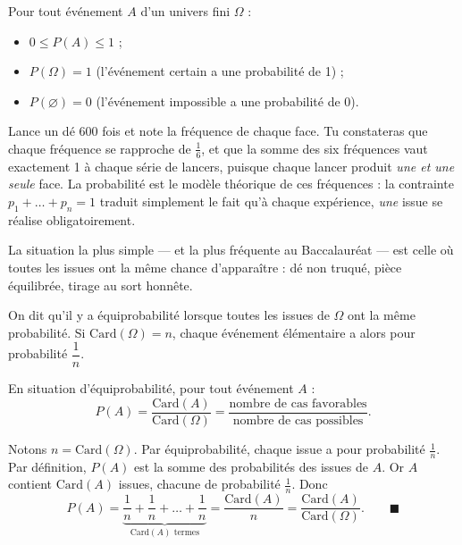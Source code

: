 \documentclass[11pt]{article}
\newcommand{\cle}[1]{{\popxbold\color{popdark}#1}}
\newcounter{popsec}
\newcounter{popsub}
\newcommand{\courssub}[1]{%
  \stepcounter{popsub}%
  \par\vspace{9pt}\noindent{\popxbold\fontsize{11.5}{13}\selectfont\color{popink}{\color{poporange}\thepopsec.\thepopsub}\hspace{6pt}#1}\par\nopagebreak\vspace{4pt}
}
\begin{document}
\begin{propriete}
Pour tout événement $A$ d'un univers fini $\Omega$ :
\begin{itemize}
\item $0 \le P(A) \le 1$ ;
\item $P(\Omega) = 1$ (l'événement certain a une probabilité de 1) ;
\item $P(\varnothing) = 0$ (l'événement impossible a une probabilité de 0).
\end{itemize}
\end{propriete}

\begin{experience}
Lance un dé 600 fois et note la fréquence de chaque face. Tu constateras que chaque fréquence se rapproche de $\frac{1}{6}$, et que la somme des six fréquences vaut exactement 1 à chaque série de lancers, puisque chaque lancer produit \emph{une et une seule} face. La probabilité est le modèle théorique de ces fréquences : la contrainte $p_1 + \dots + p_n = 1$ traduit simplement le fait qu'à chaque expérience, \emph{une} issue se réalise obligatoirement.
\end{experience}

\courssub{Le cas de l'équiprobabilité}

La situation la plus simple — et la plus fréquente au Baccalauréat — est celle où toutes les issues ont la même chance d'apparaître : dé non truqué, pièce équilibrée, tirage au sort honnête.

\begin{definition}[Équiprobabilité]
On dit qu'il y a \cle{équiprobabilité} lorsque toutes les issues de $\Omega$ ont la même probabilité. Si $\mathrm{Card}(\Omega) = n$, chaque événement élémentaire a alors pour probabilité $\dfrac{1}{n}$.
\end{definition}

\begin{propriete}
En situation d'équiprobabilité, pour tout événement $A$ :
\[ P(A) = \frac{\mathrm{Card}(A)}{\mathrm{Card}(\Omega)} = \frac{\text{nombre de cas favorables}}{\text{nombre de cas possibles}}. \]
\end{propriete}

\begin{experience}
Notons $n = \mathrm{Card}(\Omega)$. Par équiprobabilité, chaque issue a pour probabilité $\frac{1}{n}$. Par définition, $P(A)$ est la somme des probabilités des issues de $A$. Or $A$ contient $\mathrm{Card}(A)$ issues, chacune de probabilité $\frac{1}{n}$. Donc
\[ P(A) = \underbrace{\frac{1}{n} + \frac{1}{n} + \dots + \frac{1}{n}}_{\mathrm{Card}(A) \text{ termes}} = \frac{\mathrm{Card}(A)}{n} = \frac{\mathrm{Card}(A)}{\mathrm{Card}(\Omega)}. \qquad \blacksquare \]
\end{experience}
\end{document}
